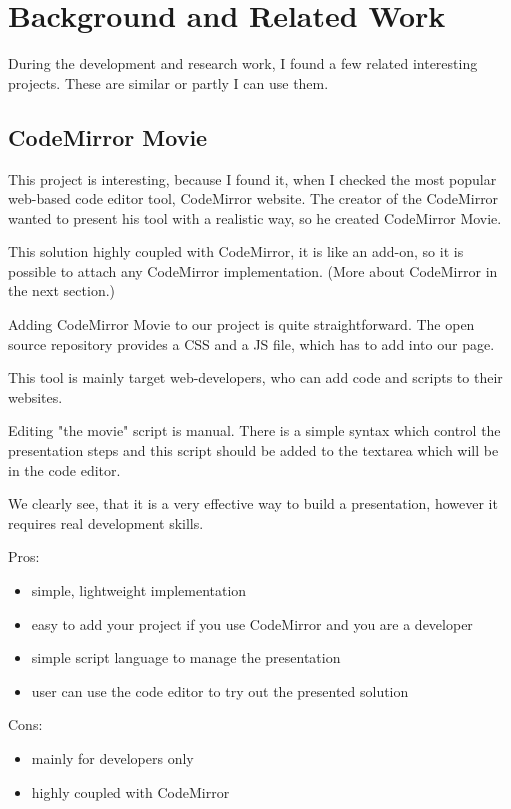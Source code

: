 \chapter{Background and Related Work}\label{C:background}

During the development and research work, I found a few related interesting projects. These are similar or partly I can use them.

\section{CodeMirror Movie}

This project is interesting, because I found it, when I checked the most popular web-based code editor tool, CodeMirror website. The creator of the CodeMirror wanted to present his tool with a realistic way, so he created CodeMirror Movie. \cite{cm-movie}

This solution highly coupled with CodeMirror, it is like an add-on, so it is possible to attach any CodeMirror implementation. (More about CodeMirror in the next section.)

Adding CodeMirror Movie to our project is quite straightforward. The open source repository provides a CSS and a JS file, which has to add into our page.

This tool is mainly target web-developers, who can add code and scripts to their websites.

Editing "the movie" script is manual. There is a simple syntax which control the presentation steps and this script should be added to the textarea which will be in the code editor.

We clearly see, that it is a very effective way to build a presentation, however it requires real development skills.

Pros:
\begin{itemize}
\item simple, lightweight implementation
\item easy to add your project if you use CodeMirror and you are a developer
\item simple script language to manage the presentation
\item user can use the code editor to try out the presented solution
\end{itemize}
Cons:
\begin{itemize}
\item mainly for developers only
\item highly coupled with CodeMirror
\end{itemize}


